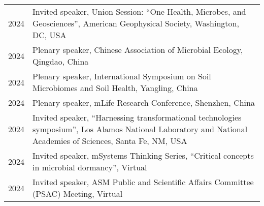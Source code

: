 \documentclass[11pt]{article}
\begin{document}
\begin{longtable}{@{}p{3em}@{\hspace{1.5em}}p{}@{}}
2024 & Invited speaker, Union Session: “One Health, Microbes, and Geosciences”, American Geophysical Society, Washington, DC, USA \\

2024 & Plenary speaker, Chinese Association of Microbial Ecology, Qingdao, China \\

2024 & Plenary speaker, International Symposium on Soil Microbiomes and Soil Health, Yangling, China \\

2024 & Plenary speaker, mLife Research Conference, Shenzhen, China \\

2024 & Invited speaker, “Harnessing transformational technologies symposium”, Los Alamos National Laboratory and National Academies of Sciences, Santa Fe, NM, USA \\

2024 & Invited speaker, mSystems Thinking Series, “Critical concepts in microbial dormancy”, Virtual \\

2024 & Invited speaker, ASM Public and Scientific Affairs Committee (PSAC) Meeting, Virtual \\
\end{longtable}
\end{document}
